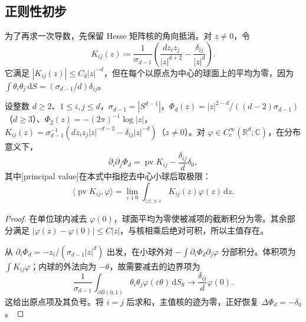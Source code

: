 \subsection{正则性初步}
\label{b2:subsec:130304}

为了再求一次导数，先保留 Hesse 矩阵核的角向抵消。对 \(z\ne0\)，令
\[
 K_{ij}(z)\coloneqq\dfrac1{\sigma_{d-1}}
 \left(\dfrac{d z_i z_j}{|z|^{d+2}}-\dfrac{\delta_{ij}}{|z|^d}\right).
\]
它满足 \(|K_{ij}(z)|\leq C_d|z|^{-d}\)，但在每个以原点为中心的球面上的平均为零，因为 \(\int\theta_i\theta_j\,\mathrm{d}S=(\sigma_{d-1}/d)\delta_{ij}\)。

\begin{lemma}\label{b2:lem:13-hessian-kernel}
设整数 \(d\geq2\)、\(1\leq i,j\leq d\)，\(\sigma_{d-1}=|S^{d-1}|\)，\(\Phi_d(z)=|z|^{2-d}/((d-2)\sigma_{d-1})\)（\(d\geq3\)）、\(\Phi_2(z)=-(2\pi)^{-1}\log|z|\)，\(K_{ij}(z)=\sigma_{d-1}^{-1}(dz_iz_j|z|^{-d-2}-\delta_{ij}|z|^{-d})\)（\(z\ne0\)）。对 \(\varphi\in C_c^\infty(\mathbb R^d;\mathbb C)\)，在分布意义下，
\[
 \partial_i\partial_j\Phi_d
 =\operatorname{pv}K_{ij}-\dfrac{\delta_{ij}}d\delta_0,
\]
其中[principal value]在本式中指挖去中心小球后取极限：
\[
 \langle\operatorname{pv}K_{ij},\varphi\rangle
 =\lim_{\varepsilon\downarrow0}\int_{|z|>\varepsilon}K_{ij}(z)\varphi(z)\,\mathrm{d}z.
\]
\end{lemma}
\begin{proof}
在单位球内减去 \(\varphi(0)\)，球面平均为零使被减项的截断积分为零。其余部分满足 \(|\varphi(z)-\varphi(0)|\leq C|z|\)，与核相乘后绝对可积，所以主值存在。

从 \(\partial_i\Phi_d=-z_i/(\sigma_{d-1}|z|^d)\) 出发，在小球外对 \(-\int\partial_i\Phi_d\partial_j\varphi\) 分部积分。体积项为 \(\int K_{ij}\varphi\)；内球的外法向为 \(-\theta\)，故需要减去的边界项为
\[
 \dfrac1{\sigma_{d-1}}\int_{\partial B(0,1)}\theta_i\theta_j\varphi(\varepsilon\theta)\,\mathrm{d}S_\theta
 \longrightarrow\dfrac{\delta_{ij}}d\varphi(0).
\]
这给出原点项及其负号。将 \(i=j\) 后求和，主值核的迹为零，正好恢复 \(\Delta\Phi_d=-\delta_0\)。
\end{proof}

